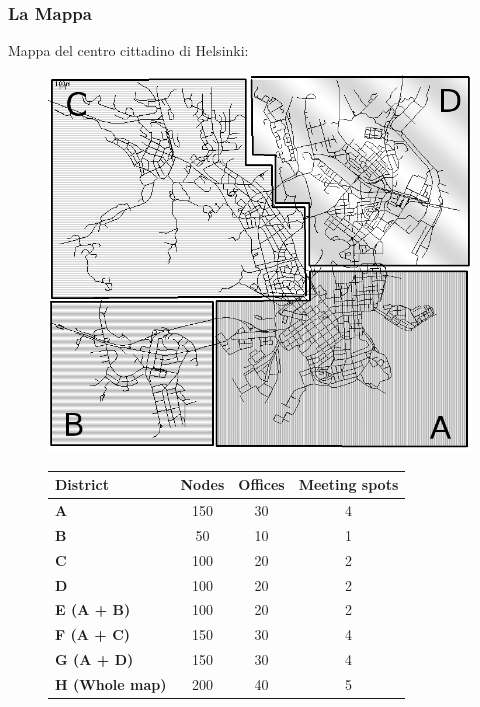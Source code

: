 \documentclass{beamer}
\begin{document}
\begin{frame}
\frametitle{La Mappa}
Mappa del centro cittadino di Helsinki:
\begin{figure}[htpb]
\begin{minipage}[b]{0.5\linewidth}
  \begin{center}
    \includegraphics[scale=0.18]{../figure/mappa_ABCD.png}      
    \label{imgMappaABCD}
  \end{center}

\end{minipage}
\hspace{0.5cm}
\begin{minipage}[b]{0.5\linewidth}
\tiny 

\begin{center}
\begin{tabular}{|l|c|c|c|}
\hline
\textbf{District} & \textbf{Nodes} & \textbf{Offices} & \textbf{Meeting spots}\\
\hline
\hline
\bfseries A & 150 & 30 & 4 \\
\hline
\bfseries B & 50 & 10 & 1 \\
\hline
\bfseries C & 100 & 20 & 2 \\
\hline
\bfseries D & 100 & 20 & 2 \\
\hline
\bfseries E (A + B) & 100 & 20 & 2 \\
\hline
\bfseries F (A + C) & 150 & 30 & 4 \\
\hline
\bfseries G (A + D) & 150 & 30 & 4 \\
\hline
\bfseries H (Whole map) & 200 & 40 & 5 \\
\hline
\end{tabular}
\end{center}   
\label{tabellaDistrettiMappa}

\normalsize
\end{minipage}
\end{figure}

\end{frame}
\end{document}
